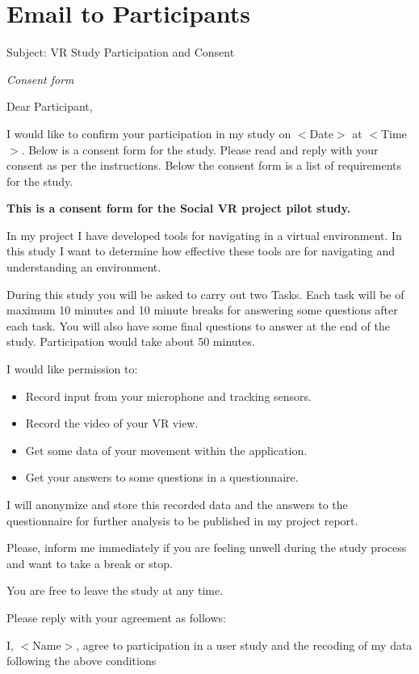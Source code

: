 \label{Appendix}
\section{Email to Participants}
\label{Appendix:Email}
Subject: VR Study Participation and Consent

\textit{Consent form}

Dear Participant,

I would like to confirm your participation in my study on $<$Date$>$ at $<$Time$>$. Below is a consent form for the study. Please read and reply with your consent as per the instructions. Below the consent form is a list of requirements for the study.

\textbf{This is a consent form for the Social VR project pilot study.}

In my project I have developed tools for navigating in a virtual environment. In this study I want to determine how effective these tools are for navigating and understanding an environment.

During this study you will be asked to carry out two Tasks. Each task will be of maximum 10 minutes and 10 minute breaks for answering some questions after each task. You will also have some final questions to answer at the end of the study. Participation would take about 50 minutes.

I would like permission to:

\begin{itemize}
	\item Record input from your microphone and tracking sensors.
	\item Record the video of your VR view.
	\item Get some data of your movement within the application.
	\item Get your answers to some questions in a questionnaire.
\end{itemize}

I will anonymize and store this recorded data and the answers to the questionnaire for further analysis to be published in my project report.

Please, inform me immediately if you are feeling unwell during the study process and want to take a break or stop.

You are free to leave the study at any time.

Please reply with your agreement as follows:

I, $<$Name$>$, agree to participation in a user study and the recoding of my data following the above conditions

